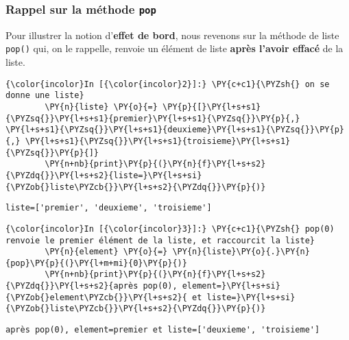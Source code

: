     \hypertarget{rappel-sur-la-muxe9thode-pop}{%
\subsubsection{\texorpdfstring{Rappel sur la méthode
\texttt{pop}}{Rappel sur la méthode pop}}\label{rappel-sur-la-muxe9thode-pop}}

    Pour illustrer la notion d'\textbf{effet de bord}, nous revenons sur la
méthode de liste \texttt{pop()} qui, on le rappelle, renvoie un élément
de liste \textbf{après l'avoir effacé} de la liste.

    \begin{Verbatim}[commandchars=\\\{\}]
{\color{incolor}In [{\color{incolor}2}]:} \PY{c+c1}{\PYZsh{} on se donne une liste}
        \PY{n}{liste} \PY{o}{=} \PY{p}{[}\PY{l+s+s1}{\PYZsq{}}\PY{l+s+s1}{premier}\PY{l+s+s1}{\PYZsq{}}\PY{p}{,} \PY{l+s+s1}{\PYZsq{}}\PY{l+s+s1}{deuxieme}\PY{l+s+s1}{\PYZsq{}}\PY{p}{,} \PY{l+s+s1}{\PYZsq{}}\PY{l+s+s1}{troisieme}\PY{l+s+s1}{\PYZsq{}}\PY{p}{]}
        \PY{n+nb}{print}\PY{p}{(}\PY{n}{f}\PY{l+s+s2}{\PYZdq{}}\PY{l+s+s2}{liste=}\PY{l+s+si}{\PYZob{}liste\PYZcb{}}\PY{l+s+s2}{\PYZdq{}}\PY{p}{)}
\end{Verbatim}


    \begin{Verbatim}[commandchars=\\\{\}]
liste=['premier', 'deuxieme', 'troisieme']

    \end{Verbatim}

    \begin{Verbatim}[commandchars=\\\{\}]
{\color{incolor}In [{\color{incolor}3}]:} \PY{c+c1}{\PYZsh{} pop(0) renvoie le premier élément de la liste, et raccourcit la liste}
        \PY{n}{element} \PY{o}{=} \PY{n}{liste}\PY{o}{.}\PY{n}{pop}\PY{p}{(}\PY{l+m+mi}{0}\PY{p}{)}
        \PY{n+nb}{print}\PY{p}{(}\PY{n}{f}\PY{l+s+s2}{\PYZdq{}}\PY{l+s+s2}{après pop(0), element=}\PY{l+s+si}{\PYZob{}element\PYZcb{}}\PY{l+s+s2}{ et liste=}\PY{l+s+si}{\PYZob{}liste\PYZcb{}}\PY{l+s+s2}{\PYZdq{}}\PY{p}{)}
\end{Verbatim}


    \begin{Verbatim}[commandchars=\\\{\}]
après pop(0), element=premier et liste=['deuxieme', 'troisieme']

    \end{Verbatim}

